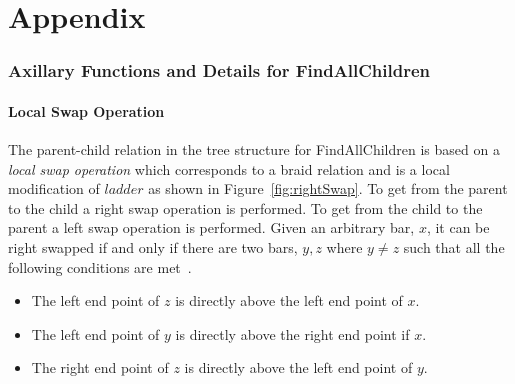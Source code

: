 

\chapter{Appendix}


\pagebreak


\subsection{Axillary Functions and Details for {\sc FindAllChildren}}
\subsubsection{Local Swap Operation}

The parent-child relation in the tree structure for {\sc FindAllChildren} is based on a \emph{local swap operation} 
which corresponds to a braid relation and is a local modification of $ladder$ as shown in Figure~\ref{fig:rightSwap}.
To get from the parent to the child a right swap operation is performed. To get from the child to the parent 
a left swap operation is performed. 
Given an arbitrary bar, $x$, it can be right swapped if and only if there are two bars, $y,z$ where $y \neq z$ 
such that all the following conditions are met~\cite{A1}.
\begin{itemize}
	\item The left end point of $z$ is directly above the left end point of $x$.
	\item The left end point of $y$ is directly above the right end point if $x$.
	\item The right end point of $z$ is directly above the left end point of $y$.
\end{itemize}

